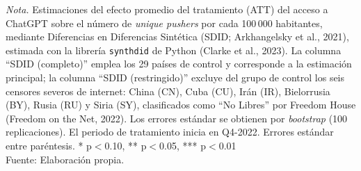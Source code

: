 \begin{table}[htbp]
\begin{minipage}{\linewidth}
\smallskip\footnotesize\textit{Nota.} Estimaciones del efecto promedio del tratamiento (ATT) del acceso a ChatGPT sobre el n\'{u}mero de \textit{unique pushers} por cada 100\,000 habitantes, mediante Diferencias en Diferencias Sint\'{e}tica (SDID; Arkhangelsky et al., 2021), estimada con la librer\'{i}a \texttt{synthdid} de Python (Clarke et al., 2023). La columna ``SDID (completo)'' emplea los 29 pa\'{i}ses de control y corresponde a la estimaci\'{o}n principal; la columna ``SDID (restringido)'' excluye del grupo de control los seis censores severos de internet: China (CN), Cuba (CU), Ir\'{a}n (IR), Bielorrusia (BY), Rusia (RU) y Siria (SY), clasificados como ``No Libres'' por Freedom House (Freedom on the Net, 2022). Los errores est\'{a}ndar se obtienen por \textit{bootstrap} (100 replicaciones). El periodo de tratamiento inicia en Q4-2022. Errores est\'{a}ndar entre par\'{e}ntesis. * p$<$0.10, ** p$<$0.05, *** p$<$0.01\\[\baselineskip]Fuente: Elaboraci\'{o}n propia.
\end{minipage}
\end{table}
